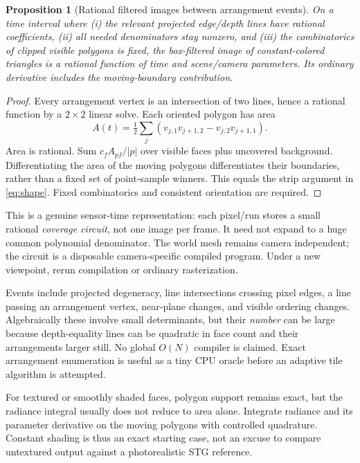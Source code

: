 \documentclass[10pt,letterpaper]{article}
\newtheorem{proposition}{Proposition}
\theoremstyle{remark}\newtheorem{counterexample}[proposition]{Counterexample}
\begin{document}
\begin{proposition}[Rational filtered images between arrangement events]
On a time interval where (i) the relevant projected edge/depth lines have rational coefficients, (ii) all needed denominators stay nonzero, and (iii) the combinatorics of clipped visible polygons is fixed, the box-filtered image of constant-colored triangles is a rational function of time and scene/camera parameters. Its ordinary derivative includes the moving-boundary contribution.
\end{proposition}
\begin{proof}
Every arrangement vertex is an intersection of two lines, hence a rational function by a $2\times2$ linear solve. Each oriented polygon has area
\begin{equation}
 A(t)=\tfrac12\sum_j(v_{j,1}v_{j+1,2}-v_{j,2}v_{j+1,1}). \label{eq:shoelace}
\end{equation}
Area is rational. Sum $c_f A_{pf}/|p|$ over visible faces plus uncovered background. Differentiating the area of the moving polygons differentiates their boundaries, rather than a fixed set of point-sample winners. This equals the strip argument in \eqref{eq:shape}. Fixed combinatorics and consistent orientation are required.
\end{proof}

This is a genuine sensor-time representation: each pixel/run stores a small rational \emph{coverage circuit}, not one image per frame. It need not expand to a huge common polynomial denominator. The world mesh remains camera independent; the circuit is a disposable camera-specific compiled program. Under a new viewpoint, rerun compilation or ordinary rasterization.

Events include projected degeneracy, line intersections crossing pixel edges, a line passing an arrangement vertex, near-plane changes, and visible ordering changes. Algebraically these involve small determinants, but their \emph{number} can be large because depth-equality lines can be quadratic in face count and their arrangements larger still. No global $O(N)$ compiler is claimed. Exact arrangement enumeration is useful as a tiny CPU oracle before an adaptive tile algorithm is attempted.

For textured or smoothly shaded faces, polygon support remains exact, but the radiance integral usually does not reduce to area alone. Integrate radiance and its parameter derivative on the moving polygons with controlled quadrature. Constant shading is thus an exact starting case, not an excuse to compare untextured output against a photorealistic STG reference.
\end{document}
